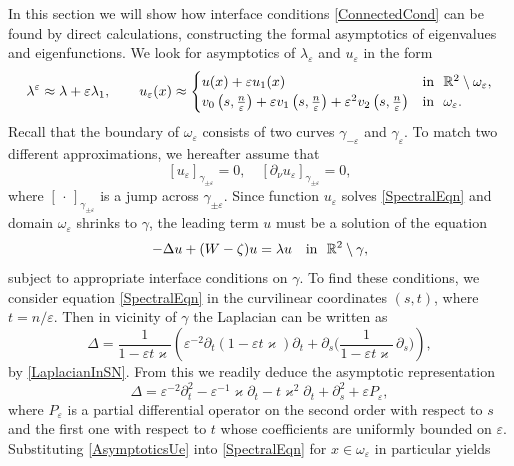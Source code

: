 \documentclass[reqno]{amsart}
\theoremstyle{plain}
\numberwithin{equation}{section}
\renewcommand{\kappa}{\varkappa}
\newcommand{\Real}{\mathbb R}
\newcommand{\eps}{\varepsilon}
\newcommand\nep{\textstyle\frac n\eps}
\begin{document}
In this section we will show how interface conditions \eqref{ConnectedCond} can be found by direct calculations, constructing the formal asymptotics of  eigenvalues and eigenfunctions.
We  look for asymptotics of $\lambda_\eps$ and $u_\eps$ in the form
\begin{equation}\label{AsymptoticsUe}
\lambda^\eps\approx \lambda+\eps \lambda_1, \qquad u_\eps(x)\approx
\begin{cases}
  u(x)+\eps u_1(x)& \hbox{in \ }\Real^2\setminus \omega_\eps, \\
    v_0\left(s,\nep\right)+\eps v_1\left(s,\nep\right)+\eps^2 v_2\left(s,\nep\right)
&\hbox{in \ } \omega_\eps.
\end{cases}
\end{equation}
Recall that the boundary of $\omega_\eps$ consists of  two curves
$\gamma_{-\eps}$ and $\gamma_{\eps}$.
To match two different approximations, we hereafter assume that
\begin{equation}\label{MatchingCnds}
  [u_\eps]_{\gamma_{\pm\eps}}=0, \quad [\partial_\nu u_\eps]_{\gamma_{\pm\eps}}=0,
\end{equation}
where $[\,\cdot\,]_{\gamma_{\pm\eps}}$ is a jump  across $\gamma_{\pm\eps}$.
Since function $u_\eps$ solves \eqref{SpectralEqn} and domain $\omega_\eps$ shrinks to $\gamma$, the leading term $u$ must be a solution of the equation
\begin{equation*}
-\Delta u+(W-\zeta)u= \lambda u \quad \hbox{in \ } \Real^2\setminus \gamma,
\end{equation*}
subject to appropriate interface conditions on $\gamma$.
To find these conditions, we consider equation \eqref{SpectralEqn} in the curvilinear coordinates $(s,t)$, where $t=n/\eps$. Then in vicinity of $\gamma$ the Laplacian can be written as
\begin{equation}
  \Delta =\frac1{1-\eps t\kappa}\left( \eps^{-2}\partial_t
  (1-\eps t\kappa)\partial_t +\partial_s
  \Big(\frac1{1-\eps t\kappa}\,\partial_s\Big)\right),
\end{equation}
by \eqref{LaplacianInSN}.
From this we readily deduce the asymptotic representation
\begin{equation*}
\Delta= \eps^{-2}\partial^2_t-\eps^{-1}\kappa\partial_t-t \kappa^2\partial_t+\partial^2_s+\eps P_\eps,
\end{equation*}
where $P_\eps$ is a partial differential operator on the second order with respect to $s$ and the first one with respect to $t$ whose coefficients  are uniformly bounded on $\eps$.
Substituting \eqref{AsymptoticsUe} into \eqref{SpectralEqn} for $x\in \omega_\eps$ in particular yields
\end{document}
